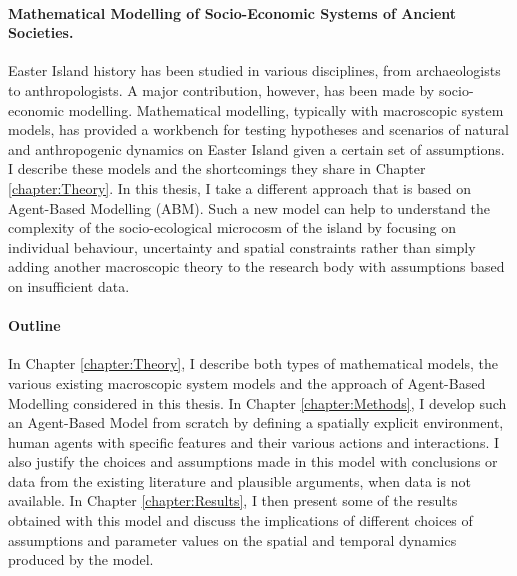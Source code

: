 
\paragraph{Mathematical Modelling of Socio-Economic Systems of Ancient Societies.}
Easter Island history has been studied in various disciplines, from archaeologists to anthropologists. 
A major contribution, however, has been made by socio-economic modelling.
Mathematical modelling, typically with macroscopic system models, has 
provided a workbench for testing hypotheses and scenarios of natural and anthropogenic dynamics on Easter Island given a certain set of assumptions.
I describe these models and the shortcomings they share in Chapter \ref{chapter:Theory}.
In this thesis, I take a different approach that is based on Agent-Based Modelling (ABM).
Such a new model can help to understand the complexity of the socio-ecological microcosm of the island by focusing on individual behaviour, uncertainty and spatial constraints rather than simply adding another macroscopic theory to the research body with assumptions based on insufficient data.

\paragraph{Outline}
In Chapter \ref{chapter:Theory}, I describe both types of mathematical models, the various existing macroscopic system models and the approach of Agent-Based Modelling considered in this thesis.
In Chapter \ref{chapter:Methods}, I develop such an Agent-Based Model from scratch by defining a spatially explicit environment, human agents with specific features and their various actions and interactions. 
I also justify the choices and assumptions made in this model with conclusions or data from the existing literature and plausible arguments, when data is not available.
In Chapter \ref{chapter:Results}, I then present some of the results obtained with this model and discuss the implications of different choices of assumptions and parameter values on the spatial and temporal dynamics produced by the model. 
